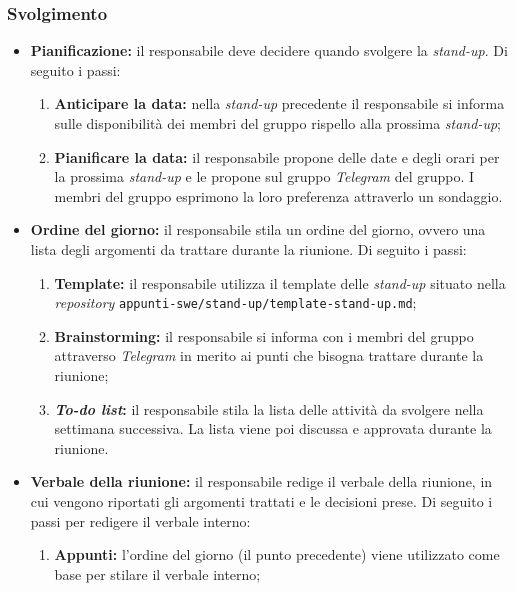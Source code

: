 \subsubsection{Svolgimento}
\begin{itemize}

	\item \textbf{Pianificazione:} il responsabile deve decidere quando
	      svolgere la \textit{stand-up}. Di seguito i passi:
	      \begin{enumerate}
		      \item \textbf{Anticipare la data:} nella \textit{stand-up}
		            precedente il responsabile si informa sulle disponibilità
		            dei membri del gruppo rispello alla prossima
		            \textit{stand-up};

		      \item \textbf{Pianificare la data:} il responsabile propone delle
		            date e degli orari per la prossima \textit{stand-up} e le
		            propone sul gruppo \textit{Telegram} del gruppo. I membri
		            del gruppo esprimono la loro preferenza attraverlo un
		            sondaggio.
	      \end{enumerate}

	\item \textbf{Ordine del giorno:} il responsabile stila un ordine del
	      giorno, ovvero una lista degli argomenti da trattare durante la
	      riunione. Di seguito i passi:
	      \begin{enumerate}
		      \item \textbf{Template:} il responsabile utilizza il template
		            delle \textit{stand-up} situato nella \textit{repository}
		            \texttt{appunti-swe/stand-up/template-stand-up.md};

		      \item \textbf{Brainstorming:} il responsabile si informa con i
		            membri del gruppo attraverso \textit{Telegram} in merito ai
		            punti che bisogna trattare durante la riunione;

		      \item \textbf{\textit{To-do list}:} il responsabile stila la lista
		            delle attività da svolgere nella settimana successiva. La
		            lista viene poi discussa e approvata durante la riunione.
	      \end{enumerate}

	\item \textbf{Verbale della riunione:} il responsabile redige il
	      verbale della riunione, in cui vengono riportati gli argomenti
	      trattati e le decisioni prese. Di seguito i passi per redigere il
	      verbale interno:
	      \begin{enumerate}
		      \item \textbf{Appunti:} l'ordine del giorno (il punto precedente)
		            viene utilizzato come base per stilare il verbale interno;


\end{enumerate}
\end{itemize}
